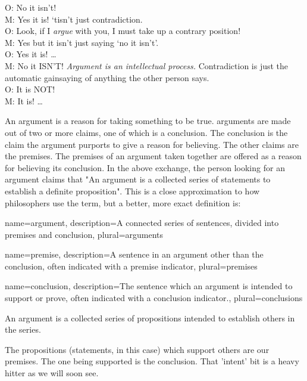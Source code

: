 {\begin{multicols}{2}
O: No it isn't!\\
M: Yes it is! ‘tisn't just contradiction.\\
O: Look, if I \emph{argue} with you, I must take up a contrary position!\\
M: Yes but it isn't just saying ‘no it isn't'.\\
O: Yes it is!
\ldots\\
M: No it ISN'T! \emph{Argument is an intellectual process.} Contradiction is just the automatic gainsaying of anything the other person says.\\
O: It is NOT!\\
M: It is!
\ldots 
\end{multicols}}

An argument is a reason for taking something to be true. \Glspl{argument} are made out of two or more claims, one of which is a \gls{conclusion}. The conclusion is the claim the argument purports to give a reason for believing. The other claims are the \glspl{premise}. The premises of an argument taken together are offered as a reason for believing its conclusion. In the above exchange, the person looking for an argument claims that "An argument is a collected series of statements to establish a definite proposition". This is a close approximation to how philosophers use the term, but a better, more exact definition is:


{
name=argument,
description={A connected series of sentences, divided into \gls{premise}s and \gls{conclusion}},
plural=arguments
}

{
name=premise,
description={A sentence in an \gls{argument} other than the \gls{conclusion}, often indicated with a premise indicator},
plural=premises
}

{
name=conclusion,
description={The sentence which an argument is intended to support or prove, often indicated with a conclusion indicator.},
plural=conclusions
}

\begin{center}
An argument is a collected series of propositions intended to establish others in the series.
\end{center}
The propositions (statements, in this case) which support others are our premises. The one being supported is the conclusion. That 'intent' bit is a heavy hitter as we will soon see.

